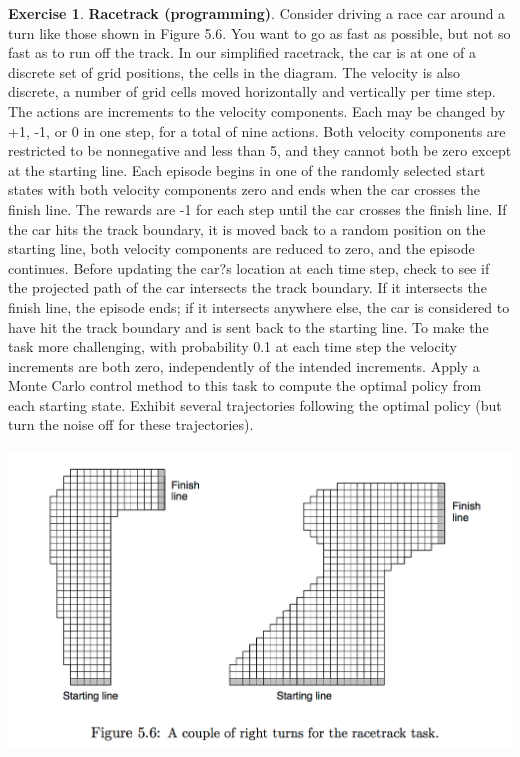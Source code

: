 \documentclass[oneside,11pt]{article}
\theoremstyle{definition}
\newtheorem{exer}[thm]{Exercise}
\begin{document}
\begin{exer}

\textbf{Racetrack (programming)}. Consider driving a race car around a turn like those shown in Figure 5.6. You want to go as fast as possible, but not so fast as to run off the track. In our simplified racetrack, the car is at one of a discrete set of grid positions, the cells in the diagram. The velocity is also discrete, a number of grid cells moved horizontally and vertically per time step. The actions are increments to the velocity components. Each may be changed by +1, -1, or 0 in one step, for a total of nine actions. Both velocity components are restricted to be nonnegative and less than 5, and they cannot both be zero except at the starting line. Each episode begins in one of the randomly selected start states with both velocity components zero and ends when the car crosses the finish line. The rewards are -1 for each step until the car crosses the finish line. If the car hits the track boundary, it is moved back to a random position on the starting line, both velocity components are reduced to zero, and the episode continues. Before updating the car?s location at each time step, check to see if the projected path of the car intersects the track boundary. If it intersects the finish line, the episode ends; if it intersects anywhere else, the car is considered to have hit the track boundary and is sent back to the starting line. To make the task more challenging, with probability 0.1 at each time step the velocity increments are both zero, independently of the intended increments. Apply a Monte Carlo control method to this task to compute the optimal policy from each starting state. Exhibit several trajectories following the optimal policy (but turn the noise off for these trajectories).


\includegraphics[width=14cm, height=8cm]{exer_5_8}


\end{exer}
\end{document}
